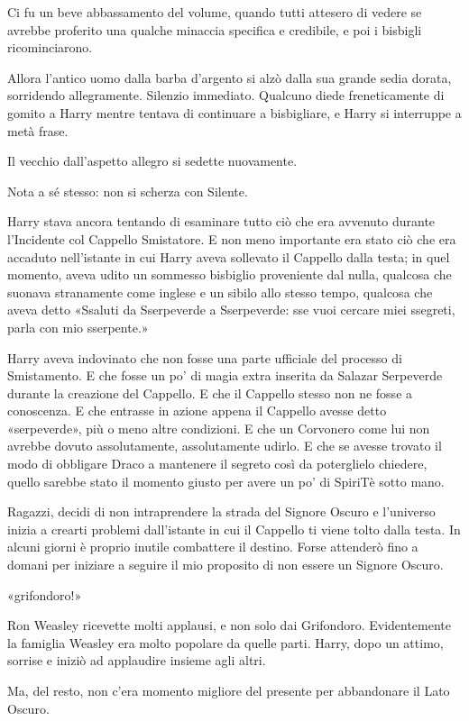Ci fu un beve abbassamento del volume, quando tutti attesero di vedere se avrebbe proferito una qualche minaccia specifica e credibile, e poi i bisbigli ricominciarono.

Allora l’antico uomo dalla barba d’argento si alzò dalla sua grande sedia dorata, sorridendo allegramente. Silenzio immediato. Qualcuno diede freneticamente di gomito a Harry mentre tentava di continuare a bisbigliare, e Harry si interruppe a metà frase.

Il vecchio dall’aspetto allegro si sedette nuovamente.

Nota a sé stesso: non si scherza con Silente.

Harry stava ancora tentando di esaminare tutto ciò che era avvenuto durante l’Incidente col Cappello Smistatore. E non meno importante era stato ciò che era accaduto nell’istante in cui Harry aveva sollevato il Cappello dalla testa; in quel momento, aveva udito un sommesso bisbiglio proveniente dal nulla, qualcosa che suonava stranamente come inglese e un sibilo allo stesso tempo, qualcosa che aveva detto «Ssaluti da Sserpeverde a Sserpeverde: sse vuoi cercare miei ssegreti, parla con mio sserpente.»

Harry aveva indovinato che non fosse una parte ufficiale del processo di Smistamento. E che fosse un po’ di magia extra inserita da Salazar Serpeverde durante la creazione del Cappello. E che il Cappello stesso non ne fosse a conoscenza. E che entrasse in azione appena il Cappello avesse detto «serpeverde», più o meno altre condizioni. E che un Corvonero come lui non avrebbe dovuto assolutamente, assolutamente udirlo. E che se avesse trovato il modo di obbligare Draco a mantenere il segreto così da poterglielo chiedere, quello sarebbe stato il momento giusto per avere un po’ di SpiriTè sotto mano.

Ragazzi, decidi di non intraprendere la strada del Signore Oscuro e l’universo inizia a crearti problemi dall’istante in cui il Cappello ti viene tolto dalla testa. In alcuni giorni è proprio inutile combattere il destino. Forse attenderò fino a domani per iniziare a seguire il mio proposito di non essere un Signore Oscuro.

«grifondoro!»

Ron Weasley ricevette molti applausi, e non solo dai Grifondoro. Evidentemente la famiglia Weasley era molto popolare da quelle parti. Harry, dopo un attimo, sorrise e iniziò ad applaudire insieme agli altri.

Ma, del resto, non c’era momento migliore del presente per abbandonare il Lato Oscuro.

